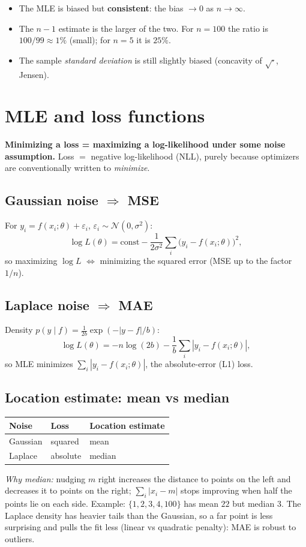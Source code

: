 \documentclass[11pt,a4paper]{article}
\begin{document}
\begin{itemize}[nosep]
  \item The MLE is biased but \textbf{consistent}: the bias $\to0$ as $n\to\infty$.
  \item The $n-1$ estimate is the larger of the two. For $n=100$ the ratio is $100/99\approx1\%$ (small); for $n=5$ it is $25\%$.
  \item The sample \emph{standard deviation} is still slightly biased (concavity of $\sqrt{\cdot}$, Jensen).
\end{itemize}

\section{MLE and loss functions}
\begin{keybox}
\textbf{Minimizing a loss = maximizing a log-likelihood under some noise assumption.}
Loss $=$ negative log-likelihood (NLL), purely because optimizers are conventionally written to \emph{minimize}.
\end{keybox}

\subsection{Gaussian noise $\Rightarrow$ MSE}
For $y_i=f(x_i;\theta)+\varepsilon_i$, $\varepsilon_i\sim\mathcal N(0,\sigma^2)$:
\[
\log L(\theta)=\text{const}-\frac{1}{2\sigma^2}\sum_i\big(y_i-f(x_i;\theta)\big)^2,
\]
so maximizing $\log L$ $\Leftrightarrow$ minimizing the squared error (MSE up to the factor $1/n$).

\subsection{Laplace noise $\Rightarrow$ MAE}
Density $p(y\mid f)=\frac{1}{2b}\exp(-|y-f|/b)$:
\[
\log L(\theta)=-n\log(2b)-\frac1b\sum_i|y_i-f(x_i;\theta)| ,
\]
so MLE minimizes $\sum_i|y_i-f(x_i;\theta)|$, the absolute-error (L1) loss.

\subsection{Location estimate: mean vs median}
\begin{center}
\begin{tabular}{@{}lll@{}}
\toprule
Noise & Loss & Location estimate \\
\midrule
Gaussian & squared & mean \\
Laplace & absolute & median \\
\bottomrule
\end{tabular}
\end{center}
\emph{Why median:} nudging $m$ right increases the distance to points on the left and decreases it to points on the right; $\sum_i|x_i-m|$ stops improving when half the points lie on each side. Example: $\{1,2,3,4,100\}$ has mean $22$ but median $3$. The Laplace density has heavier tails than the Gaussian, so a far point is less surprising and pulls the fit less (linear vs quadratic penalty): MAE is robust to outliers.
\end{document}
